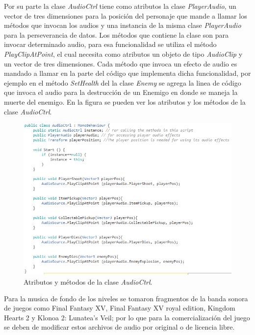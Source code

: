 Por su parte la clase \textit{AudioCtrl} tiene como atributos la clase 
\textit{PlayerAudio}, un vector de tres dimensiones para la posición del 
personaje que mande a llamar los métodos que invocan los audios y una instancia 
de la misma clase \textit{PlayerAudio} para la perseverancia de datos. Los 
métodos que contiene la clase son para invocar determinado audio, para esa 
funcionalidad se utiliza el método \textit{PlayClipAtPoint}, el cual necesita 
como atributos un objeto de tipo \textit{AudioClip} y un vector de tres 
dimensiones. Cada método que invoca un efecto de audio es mandado a llamar en la 
parte del código que implementa dicha funcionalidad, por ejemplo en el método 
\textit{SetHealth} del la clase \textit{Enemy} se agrega la linea de código que 
invoca el audio para la destrucción de un Enemigo en donde se maneja la muerte 
del enemigo. En la figura se pueden ver los atributos y los métodos de la clase 
\textit{AudioCtrl}.  

	\begin{figure}[h]
		\centering
		\includegraphics[height=0.3 \textheight]{03TrabajoRealizado/imagenes/audioCtrl.png}
		\caption{Atributos y métodos de la clase \textit{AudioCtrl}.}
		\label{fig:AudioCrl}
	\end{figure}
Para la musica de fondo de los niveles se tomaron fragmentos de la banda sonora 
de juegos como Final Fantasy XV, Final Fantasy XV royal edition, Kingdom Hearts 2 
y Klonoa 2: Lunatea's Veil; por lo que para la comercialización del juego se deben 
de modificar estos archivos de audio por original o de licencia libre.
